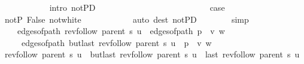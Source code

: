 \begin{isabellebody}
\ \ \ \ \ \ \ \ \ \ \isamarkupfalse%
\ {\isacharparenleft}{\kern0pt}intro\ not{\isacharunderscore}{\kern0pt}P{\isacharprime}{\kern0pt}D{\isacharparenleft}{\kern0pt}{}{\isacharparenright}{\kern0pt}{\isacharparenright}{\kern0pt}\isanewline
\ \ \ \ \ \ \isamarkupfalse%
\isanewline
\ \ \ \ \ \ \ \ \isamarkupfalse%
\ {}\isanewline
\ \ \ \ \ \ \ \ \isamarkupfalse%
\ {\isacharquery}{\kern0pt}case\isanewline
\ \ \ \ \ \ \ \ \ \ \isamarkupfalse%
\ not{\isacharunderscore}{\kern0pt}P{\isacharprime}{\kern0pt}\ False\ not{\isacharunderscore}{\kern0pt}white\isanewline
\ \ \ \ \ \ \ \ \ \ \isamarkupfalse%
\ {\isacharparenleft}{\kern0pt}auto\ dest{\isacharcolon}{\kern0pt}\ not{\isacharunderscore}{\kern0pt}P{\isacharprime}{\kern0pt}D{\isacharparenleft}{\kern0pt}{}{\isacharparenright}{\kern0pt}{\isacharparenright}{\kern0pt}\isanewline
\ \ \ \ \ \ \isamarkupfalse%
\ simp\isanewline
\ \ \ \ \isamarkupfalse%
\isanewline
\ \ \isamarkupfalse%
\isanewline
\ \ \isamarkupfalse%
\ \isamarkupfalse%
\isanewline
\ \ \ \ {\isachardoublequoteopen}edges{\isacharunderscore}{\kern0pt}of{\isacharunderscore}{\kern0pt}path\ {\isacharparenleft}{\kern0pt}rev{\isacharunderscore}{\kern0pt}follow\ {\isacharparenleft}{\kern0pt}parent\ s{\isacharparenright}{\kern0pt}\ u{\isacharparenright}{\kern0pt}\ {\isacharat}{\kern0pt}\ edges{\isacharunderscore}{\kern0pt}of{\isacharunderscore}{\kern0pt}path\ {\isacharparenleft}{\kern0pt}p\ {\isacharat}{\kern0pt}\ {\isacharbrackleft}{\kern0pt}v{\isacharcomma}{\kern0pt}\ w{\isacharbrackright}{\kern0pt}{\isacharparenright}{\kern0pt}\ {\isacharequal}{\kern0pt}\isanewline
\ \ \ \ \ edges{\isacharunderscore}{\kern0pt}of{\isacharunderscore}{\kern0pt}path\ {\isacharparenleft}{\kern0pt}butlast\ {\isacharparenleft}{\kern0pt}rev{\isacharunderscore}{\kern0pt}follow\ {\isacharparenleft}{\kern0pt}parent\ s{\isacharparenright}{\kern0pt}\ u{\isacharparenright}{\kern0pt}\ {\isacharat}{\kern0pt}\ p\ {\isacharat}{\kern0pt}\ {\isacharbrackleft}{\kern0pt}v{\isacharcomma}{\kern0pt}\ w{\isacharbrackright}{\kern0pt}{\isacharparenright}{\kern0pt}{\isachardoublequoteclose}\isanewline
\ \ \isamarkupfalse%
\ {\isacharminus}{\kern0pt}\isanewline
\ \ \ \ \isamarkupfalse%
\ {\isachardoublequoteopen}rev{\isacharunderscore}{\kern0pt}follow\ {\isacharparenleft}{\kern0pt}parent\ s{\isacharparenright}{\kern0pt}\ u\ {\isacharequal}{\kern0pt}\ butlast\ {\isacharparenleft}{\kern0pt}rev{\isacharunderscore}{\kern0pt}follow\ {\isacharparenleft}{\kern0pt}parent\ s{\isacharparenright}{\kern0pt}\ u{\isacharparenright}{\kern0pt}\ {\isacharat}{\kern0pt}\ {\isacharbrackleft}{\kern0pt}last\ {\isacharparenleft}{\kern0pt}rev{\isacharunderscore}{\kern0pt}follow\ {\isacharparenleft}{\kern0pt}parent\ s{\isacharparenright}{\kern0pt}\ u{\isacharparenright}{\kern0pt}{\isacharbrackright}{\kern0pt}{\isachardoublequoteclose}\isanewline

\end{isabellebody}
